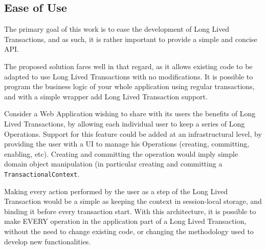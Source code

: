 \subsection{Ease of Use}

The primary goal of this work is to ease the development of Long Lived
Transactions, and as such, it is rather important to provide a simple
and concise API.

The proposed solution fares well in that regard, as it allows existing
code to be adapted to use Long Lived Transactions with no
modifications. It is possible to program the business logic of your
whole application using regular transactions, and with a simple
wrapper add Long Lived Transaction support.

Consider a Web Application wishing to share with its users the
benefits of Long Lived Transactions, by allowing each individual user
to keep a series of Long Operations. Support for this feature could be
added at an infrastructural level, by providing the user with a UI to
manage his Operations (creating, committing, enabling, etc). Creating
and committing the operation would imply simple domain object
manipulation (in particular creating and committing a
\texttt{TransactionalContext}.

Making every action performed by the user as a step of the Long Lived
Transaction would be a simple as keeping the context in session-local
storage, and binding it before every transaction start. With this
architecture, it is possible to make EVERY operation in the
application part of a Long Lived Transaction, without the need to
change existing code, or changing the methodology used to develop new
functionalities. 
